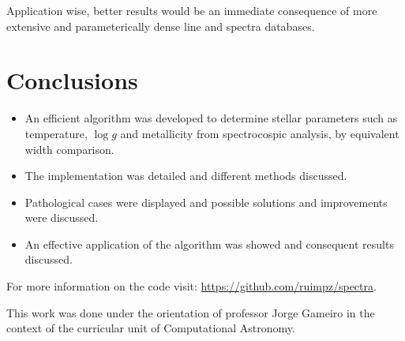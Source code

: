 \documentclass{aa}
\begin{document}
Application wise, better results would be an immediate consequence of more
extensive and parameterically dense line and spectra databases.

\section{Conclusions}

\begin{itemize}
\item An efficient algorithm was developed to determine stellar
  parameters such as temperature, $\log g$ and metallicity from spectrocospic
  analysis, by equivalent width comparison.
\item The implementation was detailed and different methods discussed.
\item Pathological cases were displayed and possible solutions and improvements were discussed.
\item An effective application of the algorithm was showed and consequent
  results discussed.
\end{itemize}

For more information on the code visit: \url{https://github.com/ruimpz/spectra}.

\begin{acknowledgements}
  This work was done under the orientation of professor Jorge Gameiro in the
  context of the curricular unit of Computational Astronomy.
\end{acknowledgements}



\end{document}
